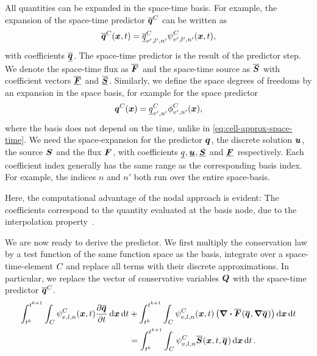All quantities can be expanded in the space-time basis.
For example, the expansion of the space-time predictor $\stpredictor[\cell]$ can be written as
\begin{equation}
  \label{eq:cell-approx-space-time}
  \stpredictor[\cell] (\bm{x}, t) = \stpredictorCoeff[\cell][v',l',n'] \stbasis[\cell][v',l',n'](\bm{x}, t),
\end{equation}
with coefficients $\stpredictorCoeff$.
The space-time predictor is the result of the predictor step.
We denote the space-time flux as $\stflux$ and the space-time source as $\stsource$ with coefficient vectors $\stfluxCoeff$ and $\stsourceCoeff$.
Similarly, we define the space degrees of freedoms by an expansion in the space basis, for example for the space predictor
\begin{equation}
  \label{eq:cell-approx-space}
  \spredictor[\cell] (\bm{x}) = \spredictorCoeff[\cell][v',n'] \sbasis[\cell][v',n'] (\bm{x}),
\end{equation}
where the basis does not depend on the time, unlike in \cref{eq:cell-approx-space-time}.
We need the space-expansion for the predictor $\spredictor$, the discrete solution $\ssol$, the source $\ssource$ and the flux $\sflux$,
with coefficients $\spredictorCoeff, \ssolCoeff, \ssourceCoeff$ and $\sfluxCoeff$ respectively.
Each coefficient index generally has the same range as the corresponding basis index.
For example, the indices $n$ and $n'$ both run over the entire space-basis.

Here, the computational advantage of the nodal approach is evident:
The coefficients correspond to the quantity evaluated at the basis node, due to the interpolation property~.

We are now ready to derive the predictor.
We first multiply the conservation law by a test function of the same function space as the basis, integrate over a space-time-element $C_{}$ and replace all terms with their discrete approximations.
In particular, we replace the vector of conservative variables $\bm{Q}$ with the space-time predictor $\stpredictor[\cell]$.
\begin{align}\label{eq:weak-pde-space-time}
\begin{split}
\intdt{\intdcell{
    \sttestfunction[\cell][v,l,n](\bm{x}, t)
    \pdv{\stpredictor}{t}
}}
&+
\intdt{\intdcell{
    \sttestfunction[\cell][v,l,n](\bm{x}, t)
    \left(
      \divergence{\stflux(\stpredictor, \gradient{\stpredictor})}
    \right)
}}
\\&=
\intdt{\intdcell{
  \sttestfunction[\cell][v,l,n] \stsource(\bm{x}, t, \stpredictor)
}}.
\end{split}
\end{align}

